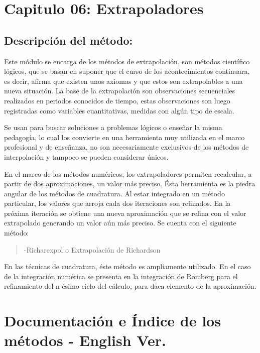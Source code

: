 \documentclass[letterpaper,10pt,oneside]{sphinxmanual}
\theoremstyle{plain}%
\theoremstyle{definition}%
\theoremstyle{remark}%
\begin{document}
\chapter{Capitulo 06: Extrapoladores}
\label{chapter06:capitulo-06-extrapoladores}\label{chapter06::doc}

\section{Descripción del método:}
\label{chapter06:descripcion-del-metodo}
Este módulo se encarga de los métodos de extrapolación, son métodos científico lógicos, que se basan en suponer que el curso de los acontecimientos continuara, es decir, afirma que existen unos axiomas y que estos son extrapolables a una nueva situación. La base de la extrapolación son observaciones secuenciales realizados en periodos conocidos de tiempo, estas observaciones son luego registradas como variables cuantitativas, medidas con algún tipo de escala.\medskip

Se usan para buscar soluciones a problemas lógicos o enseñar la misma pedagogía, lo cual los convierte en una herramienta muy utilizada en el marco
profesional y de enseñanza, no son necesariamente exclusivos de los métodos de interpolación y tampoco se pueden considerar únicos.

En el marco de los métodos numéricos, los extrapoladores permiten recalcular, a partir de dos aproximaciones, un valor más preciso. Ésta herramienta es la piedra angular de los métodos de cuadratura. Al estar integrado en un método particular, los valores que arroja cada dos iteraciones son refinados. En la próxima iteración se obtiene una nueva aproximación que se refina con el valor extrapolado generando un valor aún más preciso.
Se cuenta con el siguiente método:

\begin{quote}
\begin{description}
\item[{-Richarexpol o Extrapolación de Richardson}]
\end{description}
\end{quote}

En las técnicas de cuadratura, éste método es ampliamente utilizado. En el caso de la integración numérica se presenta en la integración de Romberg para el refinamiento del n-ésimo ciclo del cálculo, para daca elemento de la aproximación.

\chapter{Documentación e Índice de los métodos - English Ver.}
\label{code::doc}\label{code:documentacion-e-indice-de-los-metodos-english-ver}
\end{document}
